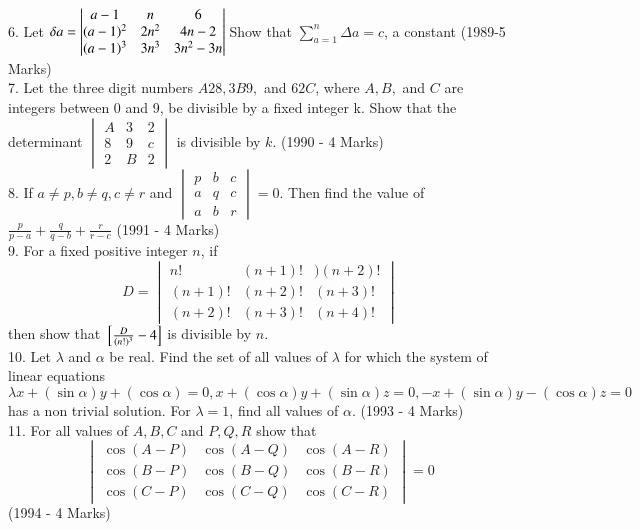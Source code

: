 \documentclass[journal,12pt,twocolumn]{IEEEtran}
\theoremstyle{remark}
\begin{document}
6. Let $\delta a=\begin{vmatrix}a-1&n&6\\(a-1)^2&2n^2&4n-2\\(a-1)^3&3n^3&3n^2-3n\end{vmatrix}\\$Show that $\displaystyle\sum_{a=1}^{n}\Delta a=c$, a constant \hfill (1989-5 Marks)\\[2pt]


7. Let the three digit numbers $A28, 3B9,$ and $62C$, where $A, B,$ and $C$ are integers between 0 and 9, be divisible by a fixed integer k. Show that the determinant $\begin{vmatrix}A&3&2\\8&9&c\\2&B&2\end{vmatrix}$ is divisible by $k$. \hfill (1990 - 4 Marks)\\[2pt]


8. If $a\neq p, b\neq q, c\neq r$ and $\begin{vmatrix}p&b&c\\a&q&c\\a&b&r\end{vmatrix}=0$. Then find the value of $\frac{p}{p-a}+\frac{q}{q-b}+\frac{r}{r-c}$ \hfill (1991 - 4 Marks)\\[2pt]


9. For a fixed positive integer $n$, if $$D=\begin{vmatrix}n!&(n+1)!&)(n+2)!\\(n+1)!&(n+2)!&(n+3)!\\(n+2)!&(n+3)!&(n+4)!\end{vmatrix}$$ then show that ${}\left[\frac{D}{(n!)^3}-4\right]$ is divisible by $n$.\\[2pt]

10. Let $\lambda$ and $\alpha$ be real. Find the set of all values of $\lambda$ for which the system of linear equations $$\lambda x+(\sin\alpha)y+(\cos\alpha)=0, x+(\cos\alpha)y+(\sin\alpha)z=0,-x+(\sin\alpha)y-(\cos\alpha)z=0$$ has a non trivial solution. For $\lambda = 1$, find all values of $\alpha$. \hfill (1993 - 4 Marks)\\[2pt]

11. For all values of $A,B,C$ and $P,Q,R$ show that $$\begin{vmatrix}\cos(A-P)&\cos(A-Q)&\cos(A-R)\\\cos(B-P)&\cos(B-Q)&\cos(B-R)\\\cos(C-P)&\cos(C-Q)&\cos(C-R)\end{vmatrix}=0$$ \hfill (1994 - 4 Marks)\\[2pt]
\end{document}
